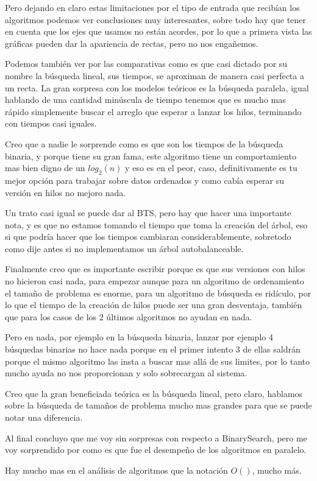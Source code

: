 \documentclass[12pt, fleqn]{article}                             %
\theoremstyle{break}                                            %
\begin{document}
\begin{itemize}
        Pero dejando en claro estas limitaciones por el tipo de entrada que recibían los algoritmos podemos ver conclusiones muy interesantes, 
        sobre todo hay que tener en cuenta que los ejes que usamos no están acordes, por lo que a primera vista las gráficas pueden dar la
        apariencia de rectas, pero no nos engañemos.

        Podemos también ver por las comparativas como es que casi dictado por su nombre la búsqueda lineal, sus tiempos, se aproximan de manera
        casi perfecta a un recta. La gran sorpresa con los modelos teóricos es la búsqueda paralela, igual hablando de una cantidad minúscula de tiempo tenemos
        que es mucho mas rápido simplemente buscar el arreglo que esperar a lanzar los hilos, terminando con tiempos casi iguales.

        Creo que a nadie le sorprende como es que son los tiempos de la búsqueda binaria, y porque tiene su gran fama, 
        este algoritmo tiene un comportamiento mas bien digno de un $log_2(n)$ y eso es en el peor, caso, definitivamente
        es tu mejor opción para trabajar sobre datos ordenados y como cabía esperar su versión en hilos no mejoro nada.

        Un trato casi igual se puede dar al BTS, pero hay que hacer una importante nota, y es que no estamos tomando el tiempo que toma
        la creación del árbol, eso si que podría hacer que los tiempos cambiaran considerablemente, sobretodo como dije antes si no implementamos
        un árbol autobalanceable.

        Finalmente creo que es importante escribir porque es que sus versiones con hilos no hicieron casi nada, para empezar aunque
        para un algoritmo de ordenamiento el tamaño de problema es enorme, para un algoritmo de búsqueda es ridículo,  por lo que el tiempo
        de la creación de hilos puede ser una gran desventaja, también que para los casos de los 2 últimos algoritmos no ayudan en nada.

        Pero en nada, por ejemplo en la búsqueda binaria, lanzar por ejemplo 4 búsquedas binarias no hace nada porque en el primer
        intento 3 de ellas saldrán porque el mismo algoritmo las insta a buscar mas allá de sus limites, por lo tanto mucho ayuda no nos proporcionan
        y solo sobrecargan al sistema.

        Creo que la gran beneficiada teórica es la búsqueda lineal, pero claro, hablamos sobre la búsqueda de tamaños de problema mucho
        mas grandes para que se puede notar una diferencia.

        Al final concluyo que me voy sin sorpresas con respecto a BinarySearch, pero me voy sorprendido por como es que
        fue el desempeño de los algoritmos en paralelo.
        
        Hay mucho mas en el análisis de algoritmos que la notación $O()$, mucho más.
        
\end{itemize}
\end{document}
